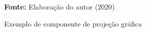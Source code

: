\begin{figure}[ht!]
\centering

\caption{\textmd{Exemplo de componente de projeção gráfica}}
\label{fig:swingbutton}

\par\medskip\textbf{Fonte:} Elaboração do autor (2020) \par\medskip

\end{figure}

